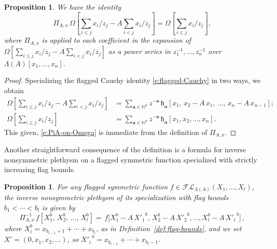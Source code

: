 \documentclass[12pt]{amsart}
\newtheorem{prop}[thm]{Proposition}
\theoremstyle{definition}
\theoremstyle{remark}
\newcommand{\NN}{{\mathbb N}}
\newcommand{\aA}{{\mathbf a}}
\newcommand{\fh}{{\mathfrak h}}
\newcommand{\FLambda}{\mathcal{F\!L}}
\begin{document}
\begin{prop}\label{prop:PiA-on-Omega}
We have the identity
\begin{equation}\label{e:PiA-on-Omega}
\Pi _{A,x}\, \Omega [\sum _{i\leq j}x_{i}/z_{j} - A\sum
_{i<j}x_{i}/z_{j}] = \Omega [\sum _{i\leq j}x_{i}/z_{j}],
\end{equation}
where $\Pi _{A,x}$ is applied to each coefficient in the expansion of
$\Omega [\sum _{i\leq j}x_{i}/z_{j} - A\sum _{i<j}x_{i}/z_{j}]$ as a
power series in $z_{1}^{-1},\ldots,z_{n}^{-1}$ over $\Lambda
(A)[x_{1},\ldots,x_{n}]$.
\end{prop}

\begin{proof}
Specializing the flagged Cauchy identity \eqref{e:flagged-Cauchy} in
two ways, we obtain
\begin{align}\label{e:flagged-Cauchy-with-A}
\Omega [\sum _{i\leq j}x_{i}/z_{j} - A\sum _{i<j}x_{i}/z_{j}] & = \sum
_{\aA \in \NN ^{n}} z^{-\aA }\, \fh _{\aA }[x_{1},\, x_{2}-A\, x_{1},\,
\ldots,\, x_{n}-A\, x_{n-1}];\\
\label{e:flagged-Cauchy-without-A} \Omega [\sum _{i\leq j}x_{i}/z_{j}
] & = \sum _{\aA \in \NN ^{n}} z^{-\aA }\, \fh _{\aA }[x_{1}, x_{2},
\ldots, x_{n}].
\end{align}
This given, \eqref{e:PiA-on-Omega} is immediate from the definition of
$\Pi _{A,x}$.
\end{proof}

Another straightforward consequence of the definition is a formula for
inverse nonsymmetric plethysm on a flagged symmetric function
specialized with strictly increasing flag bounds.


\begin{prop}\label{prop:PiA-inv-flag-bounds}
For any flagged symmetric function $f\in \FLambda _{\Lambda
(A)}(X_{1},\ldots,X_{l})$, the inverse nonsymmetric plethysm of its
specialization with flag bounds $b_{1}<\cdots <b_{l}$ is given by
\begin{equation}\label{e:PiA-inv-flag-bounds}
 \Pi _{A,x}^{-1}\, f[X_1^b,\, X_2^b,\, \ldots,\, X_l^b] = \, f
\bigl[X_1^b-A\,{X'_1}^{b} ,\, X_2^b-A\,{X'_2}^{b}
,\ldots,X_{l}^b-A\,{X'_{l\,}}^{b}\bigr]\,,
\end{equation}
where $X^b_i = x_{b_{i-1}+1} + \cdots + x_{b_i}$, as in
Definition~\ref{def:flag-bounds}, and we set $X' =
(0,x_{1},x_{2},\ldots)$, so ${X'_{i\,}}^b = x_{b_{i-1}}+ \cdots +
x_{b_i-1}$.
\end{prop}
\end{document}

